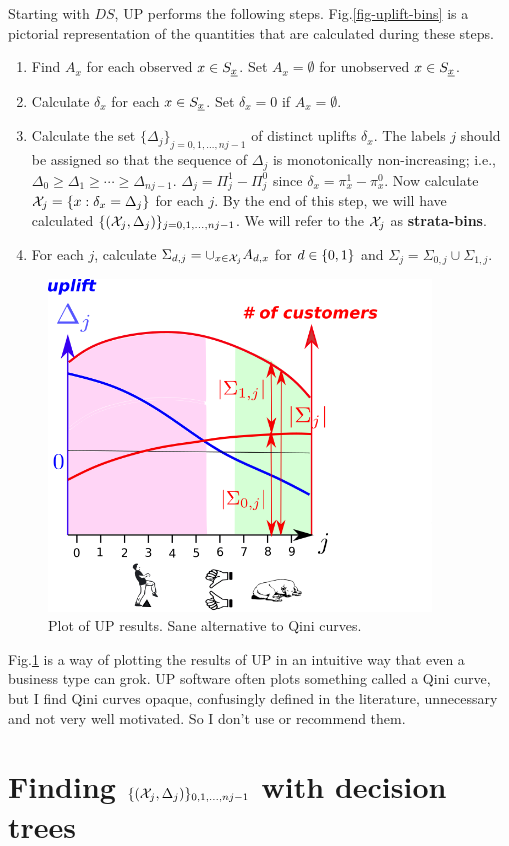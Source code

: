 Starting with $DS$,
UP performs the following steps.
Fig.\ref{fig-uplift-bins}
is a pictorial representation
of the quantities
that are calculated
during these steps.

\begin{enumerate}
\item Find $A_x$ 
for each observed $x\in S_{\underline{x}}$.
Set $A_x=\emptyset$ for unobserved $x\in S_{\underline{x}}$.
 
\item Calculate $\delta_x$
for each $x\in S_{\underline{x}}$.
Set $\delta_x=0$ if $A_x=\emptyset$.

\item Calculate
the set $\{\Delta_j\}_{j=0, 1, \ldots, nj-1}$
of distinct uplifts $\delta_x$.
The labels 
$j$ should be assigned
so that the sequence of
$\Delta_j$
is monotonically non-increasing; i.e.,
$\Delta_0 \geq \Delta_{1}\geq\cdots \geq \Delta_{nj-1}$.
 $\Delta_j = \Pi_j^1-\Pi_j^0$
since $\delta_x=\pi^1_x - \pi^0_x$.
Now calculate
${\cal X}_j =\{ x: \delta_x =\Delta_j\}$ for each $j$.
By the end of this step,
we will have calculated 
$\{({\cal X}_j, \Delta_j)\}_{j=0,1, \ldots, nj-1}$.
We will refer to the ${\cal X}_j$
as {\bf strata-bins}.
\item
For each $j$,
calculate $\Sigma_{d,j}=\cup_{x\in {\cal X}_j}A_{d,x}$
for $d\in\{0,1\}$
and $\Sigma_{j}=\Sigma_{0,j}
\cup \Sigma_{1,j}$.
\end{enumerate}


\begin{figure}[h!]
\centering
\includegraphics[width=4in]
{uplift/qini-fake.png}

\caption{
Plot
of UP results.
Sane alternative to Qini curves.
} 
\label{fig-qini-fake}
\end{figure}
Fig.\ref{fig-qini-fake}
is a  way of
plotting
the results 
of UP in an
intuitive
way
that even a
business type can grok.
UP software
often plots something
called a Qini
curve, 
but I find Qini
curves opaque, confusingly defined 
in the literature, unnecessary
and 
not very well motivated. So I don't
use or recommend them.




\section{Finding 
$\{({\cal X}_j, \Delta_j)\}_{0,1, \ldots, nj-1}$ with decision trees}
